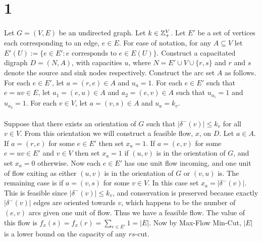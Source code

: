 \documentclass[letterpaper,12pt,oneside,onecolumn]{article}
\begin{document}
\section*{1}
\paragraph{}
Let $G=(V,E)$ be an undirected graph. Let $k \in \mathbb{Z}_+^V$. Let $E'$ be a set of vertices each corresponding to an edge, $e\in E$. For ease of notation, for any $A \subseteq V$ let $E'(U) := \{e \in E' : e \text{ corresponds to } e \in E(U) \}$. Construct a capacitated digraph $D=(N,A)$, with capacities $u$, where $N = E' \cup V \cup \{r,s\}$ and $r$ and $s$ denote the source and sink nodes respectively. Construct the arc set $A$ as follows. For each $e \in E'$, let $a = (r,e) \in A$ and $u_a = 1$. For each $e \in E'$ such that $e=uv \in E$, let $a_1 = (e,u) \in A$ and $a_2 = (e,v) \in A$ such that $u_{a_1} = 1$ and $u_{a_2} = 1$. For each $v \in V$, let $a = (v,s) \in A$ and $u_a = k_v$.
\paragraph{}
Suppose that there exists an orientation of $G$ such that $|\delta^-(v)|\leq k_v$ for all $v \in V$. From this orientation we will construct a feasible flow, $x$, on $D$. Let $a\in A$. If $a = (r,e)$ for some $e \in E'$ then set $x_a = 1$. If $a = (e,v)$ for some $e=uv \in E'$ and $v \in V$ then set $x_a = 1$ if $(u,v)$ is in the orientation of $G$, and set $x_a = 0$ otherwise. Now each $e \in E'$ has one unit flow incoming, and one unit of flow exiting as either $(u,v)$ is in the orientation of $G$ or $(v,u)$ is. The remaining case is if $a = (v,s)$ for some $v \in V$. In this case set $x_a = |\delta^-(v)|$. This is feasible since $|\delta^-(v)|\leq k_v$, and conservation is preserved because exactly $|\delta^-(v)|$ edges are oriented towards $v$, which happens to be the number of $(e,v)$ arcs given one unit of flow. Thus we have a feasible flow. The value of this flow is $f_x(s) = f_x(r) = \sum_{e\in E'} 1 = |E|$. Now by Max-Flow Min-Cut, $|E|$ is a lower bound on the capacity of any $rs$-cut.
\end{document}

